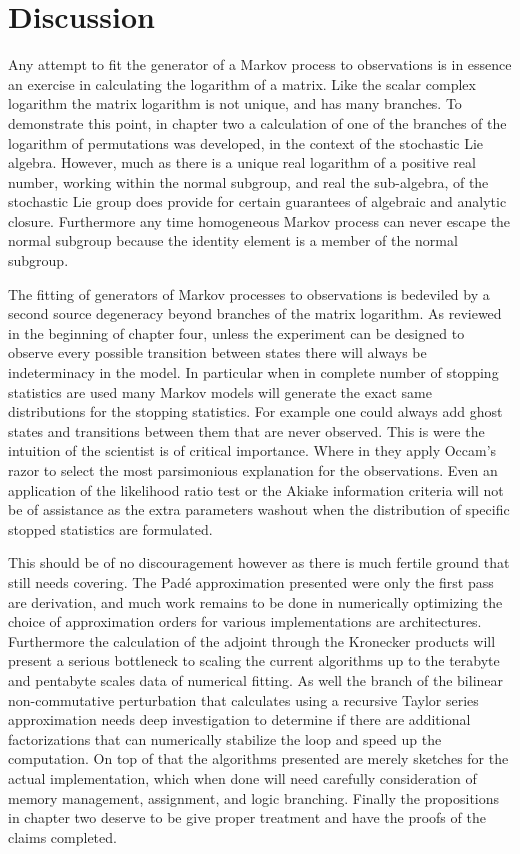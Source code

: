\section{Discussion}
Any attempt to fit the generator of a Markov process to observations is in essence an 
exercise in calculating the logarithm of a matrix. Like the scalar complex logarithm the
matrix logarithm is not unique, and has many branches. To demonstrate this point, in chapter
two a calculation of one of the branches of the logarithm of permutations was developed, in
the context of the stochastic Lie algebra. However, much as there is a unique real logarithm
of a positive real number, working within the normal subgroup, and real the sub-algebra, of
the stochastic Lie group does provide for certain guarantees of algebraic and analytic
closure. Furthermore any time homogeneous Markov process can never escape the normal
subgroup because the identity element is a member of the normal subgroup.

The fitting of generators of Markov processes to observations is bedeviled by a second
source degeneracy beyond branches of the matrix logarithm. As reviewed in the beginning of
chapter four, unless the experiment can be designed to observe every possible transition
between states there will always be indeterminacy in the model. In particular when in 
complete number of stopping statistics are used many Markov models will generate the exact
same distributions for the stopping statistics. For example one could always add ghost
states and transitions between them that are never observed. This is were the intuition of
the scientist is of critical importance. Where in they apply Occam's razor to select the
most parsimonious explanation for the observations. Even an application of the likelihood
ratio test or the Akiake information criteria \cite{akaike_new_1974} will not be of 
assistance as the extra parameters washout when the distribution of specific stopped
statistics are formulated.

This should be of no discouragement however as there is much fertile ground that still needs
covering. The Pad\'{e} approximation presented were only the first pass are derivation, and
much work remains to be done in numerically optimizing the choice of approximation orders
for various implementations are architectures. Furthermore the calculation of the adjoint
through the Kronecker products will present a serious bottleneck to scaling the current
algorithms up to the terabyte and pentabyte scales data of numerical fitting. As well the 
branch of the bilinear non-commutative perturbation that calculates using a recursive Taylor
series approximation needs deep investigation to determine if there are additional
factorizations that can numerically stabilize the loop and speed up the computation. On top
of that the algorithms presented are merely sketches for the actual implementation, which
when done will need carefully consideration of memory management, assignment, and logic
branching. Finally the propositions in chapter two deserve to be give proper treatment and
have the proofs of the claims completed.